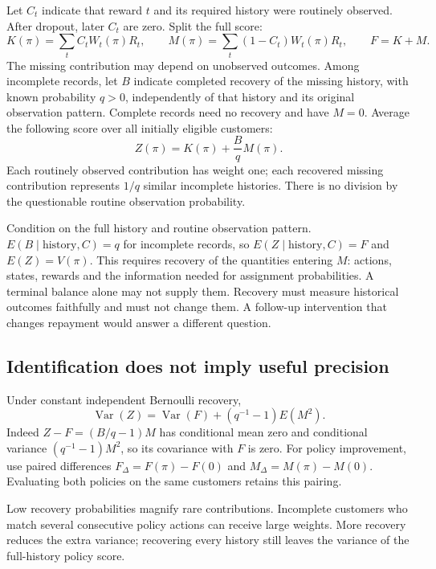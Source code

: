 Let $C_t$ indicate that reward $t$ and its required history were routinely
observed. After dropout, later $C_t$ are zero. Split the full score:
\[
K(\pi)=\sum_t C_tW_t(\pi)R_t,\qquad
M(\pi)=\sum_t(1-C_t)W_t(\pi)R_t,\qquad F=K+M.
\]
The missing contribution may depend on unobserved outcomes. Among incomplete
records, let $B$ indicate completed recovery of the missing history, with
known probability $q>0$, independently of that history and its original
observation pattern. Complete records need no recovery and have $M=0$.
Average the following score over all initially eligible customers:
\begin{equation}
Z(\pi)=K(\pi)+\frac{B}{q}M(\pi).
\label{closure30:audit-score}
\end{equation}
Each routinely observed contribution has weight one; each recovered missing
contribution represents $1/q$ similar incomplete histories. There is no
division by the questionable routine observation probability.

Condition on the full history and routine observation pattern.
$E(B\mid\text{history},C)=q$ for incomplete records, so
$E(Z\mid\text{history},C)=F$ and $E(Z)=V(\pi)$. This requires recovery of
the quantities entering $M$: actions, states, rewards and the information
needed for assignment probabilities. A terminal balance alone may not
supply them. Recovery must measure historical outcomes faithfully and must
not change them. A follow-up intervention that changes repayment would
answer a different question.

\subsection{Identification does not imply useful precision}
Under constant independent Bernoulli recovery,
\begin{equation}
\operatorname{Var}(Z)=\operatorname{Var}(F)
                   +(q^{-1}-1)E(M^2).
\label{closure30:audit-variance}
\end{equation}
Indeed $Z-F=(B/q-1)M$ has conditional mean zero and conditional variance
$(q^{-1}-1)M^2$, so its covariance with $F$ is zero. For policy improvement,
use paired differences $F_\Delta=F(\pi)-F(0)$ and
$M_\Delta=M(\pi)-M(0)$. Evaluating both policies on the same customers
retains this pairing.

Low recovery probabilities magnify rare contributions. Incomplete customers
who match several consecutive policy actions can receive large weights.
More recovery reduces the extra variance; recovering every history still
leaves the variance of the full-history policy score.

